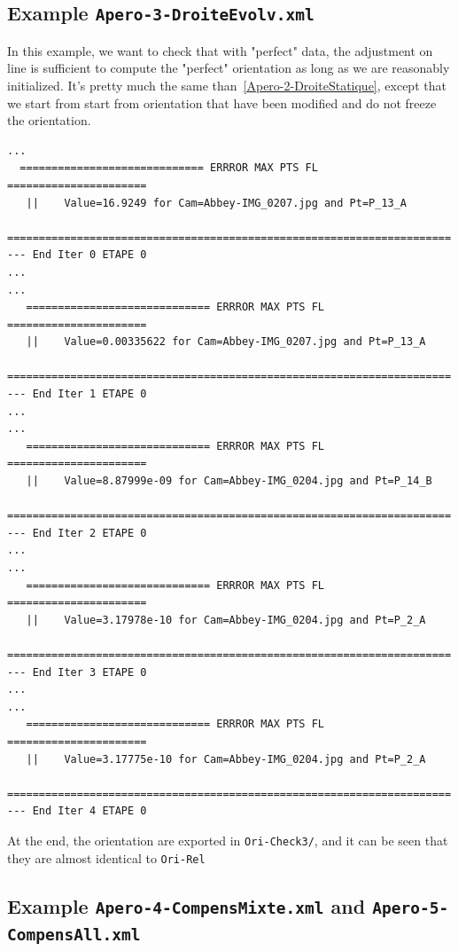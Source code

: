 
\subsection{Example {\tt Apero-3-DroiteEvolv.xml}}

In this example, we  want to check that with "perfect" data, the adjustment on line
is sufficient to compute the "perfect" orientation as long as we are reasonably initialized.
It's pretty much the same than~\ref{Apero-2-DroiteStatique},
except that we start from start from orientation that have been modified and
do not freeze the orientation.


\begin{verbatim}
...
  ============================= ERRROR MAX PTS FL ======================
   ||    Value=16.9249 for Cam=Abbey-IMG_0207.jpg and Pt=P_13_A
   ======================================================================
--- End Iter 0 ETAPE 0
...
...
   ============================= ERRROR MAX PTS FL ======================
   ||    Value=0.00335622 for Cam=Abbey-IMG_0207.jpg and Pt=P_13_A
   ======================================================================
--- End Iter 1 ETAPE 0
...
...
   ============================= ERRROR MAX PTS FL ======================
   ||    Value=8.87999e-09 for Cam=Abbey-IMG_0204.jpg and Pt=P_14_B
   ======================================================================
--- End Iter 2 ETAPE 0
...
...
   ============================= ERRROR MAX PTS FL ======================
   ||    Value=3.17978e-10 for Cam=Abbey-IMG_0204.jpg and Pt=P_2_A
   ======================================================================
--- End Iter 3 ETAPE 0
...
...
   ============================= ERRROR MAX PTS FL ======================
   ||    Value=3.17775e-10 for Cam=Abbey-IMG_0204.jpg and Pt=P_2_A
   ======================================================================
--- End Iter 4 ETAPE 0

\end{verbatim}

At the end, the orientation are exported in {\tt Ori-Check3/}, and it can be seen that they are almost identical to {\tt Ori-Rel}



\subsection{Example {\tt Apero-4-CompensMixte.xml} and  {\tt  Apero-5-CompensAll.xml}}

